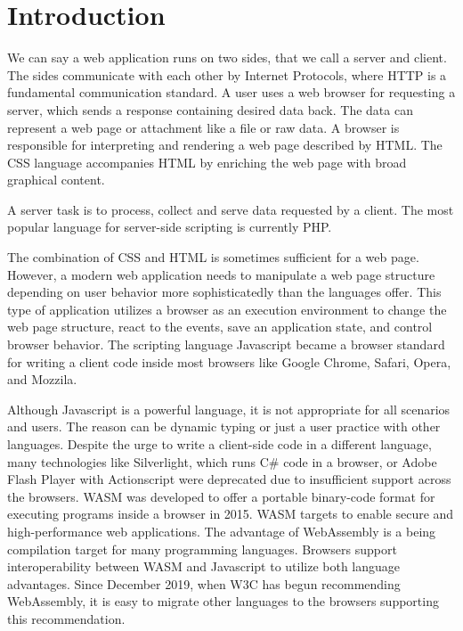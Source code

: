 \chapter{Introduction}

We can say a web application runs on two sides, that we call a server and client.
The sides communicate with each other by Internet Protocols, where
\ac{HTTP} is a fundamental communication standard.
A user uses a web browser for requesting a server, which sends a response containing desired data back.
The data can represent a web page or attachment like a file or raw data.
A browser is responsible for interpreting and rendering a web page described by \ac{HTML}.
The \ac{CSS} language accompanies HTML by enriching the web page with broad graphical content. 
\par
A server task is to process, collect and serve data requested by a client.
The most popular language for server-side scripting is currently PHP. 
\par
The combination of CSS and HTML is sometimes sufficient for a web page.
However, a modern web application needs to manipulate a web page structure depending on user behavior more sophisticatedly than the languages offer.
This type of application utilizes a browser as an execution environment to change the web page structure, react to the events, save an application state, and control browser behavior. 
The scripting language Javascript became a browser standard for writing a client code inside most browsers like Google Chrome, Safari, Opera, and Mozzila.
\par
Although Javascript is a powerful language, it is not appropriate for all scenarios and users.
The reason can be dynamic typing or just a user practice with other languages.
Despite the urge to write a client-side code in a different language, many technologies like Silverlight, which runs C\# code in a browser, or Adobe Flash Player with Actionscript were deprecated due to insufficient support across the browsers.
\ac{WASM} \cite{online:wasmWiki} was developed to offer a portable binary-code format for executing programs inside a browser in 2015.
WASM targets to enable secure and high-performance web applications.
The advantage of WebAssembly is a being compilation target for many programming languages.
Browsers support interoperability between WASM and Javascript to utilize both language advantages.
Since December 2019, when \ac{W3C} has begun recommending WebAssembly, it is easy to migrate other languages to the browsers supporting this recommendation.
